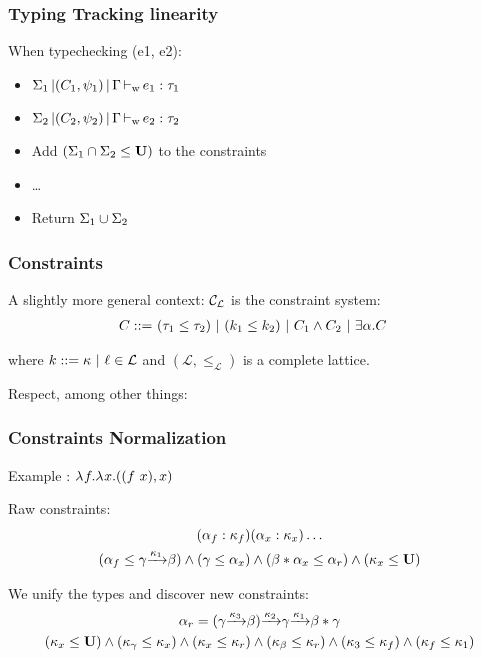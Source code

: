 \documentclass[xcolor=svgnames,11pt]{beamer}
\begin{document}
\begin{frame}
  \frametitle{Typing \hfill Tracking linearity}

  When typechecking (e1, e2):
  \begin{itemize}[<+->]
  \item $\Sigma_1 \operatorname{|} (C_1,\psi_1) \operatorname{|} \Gamma \operatorname{\vdash_w} e_1 : \tau_1$
  \item $\Sigma_2 \operatorname{|} (C_2,\psi_2) \operatorname{|} \Gamma \operatorname{\vdash_w} e_2 : \tau_2$
  \item Add  $(\Sigma_1\cap\Sigma_2\leq \mathbf{U})$ to the constraints
  \item \dots
  \item Return $\Sigma_1\cup\Sigma_2$
  \end{itemize}

\end{frame}


\begin{frame}
  \frametitle{Constraints}

  A slightly more general context: ${\mathcal C_{\mathcal L}}$ is the constraint system:
  \begin{align*}
    C ::=&\ (\tau_1 \leq \tau_2)\ |\ (k_1 \leq k_2)\ |\ C_1 \wedge C_2\ |\ \exists \alpha.C
  \end{align*}

  where $k ::=\kappa\ |\ \ell \in {\mathcal L}$ and
  $(\mathcal L, \leq_{\mathcal L})$ is a complete lattice.
  \pause

  Respect, among other things:

\end{frame}

\begin{frame}
  \frametitle{Constraints \hfill Normalization}

  Example : $\lambda^{{}} f.{\lambda^{{}} x.{((f\ x),x)}}$

  Raw constraints:
  \begin{gather*}
    (\alpha_f : \kappa_f)
    (\alpha_x : \kappa_x)\dots\\
    (\alpha_f \leq \gamma {\xrightarrow{\kappa_1}} \beta )
    \wedge
    (\gamma \leq \alpha_x)
    \wedge
    (\beta * \alpha_x \leq \alpha_r)
    \wedge
    (\kappa_x \leq \mathbf{U})
  \end{gather*}\pause

  We unify the types and discover new constraints:
  \begin{gather*}
    \alpha_r =
    (\gamma {\xrightarrow{\kappa_3}} \beta) {\xrightarrow{\kappa_2}} \gamma {\xrightarrow{\kappa_1}} \beta * \gamma\\
    (\kappa_x \leq \mathbf{U})
    \wedge
    (\kappa_\gamma \leq \kappa_x)
    \wedge
    (\kappa_x \leq \kappa_r)
    \wedge
    (\kappa_\beta \leq \kappa_r)
    \wedge
    (\kappa_3 \leq \kappa_f)
    \wedge
    (\kappa_f \leq \kappa_1)
  \end{gather*}
\end{frame}
\end{document}
